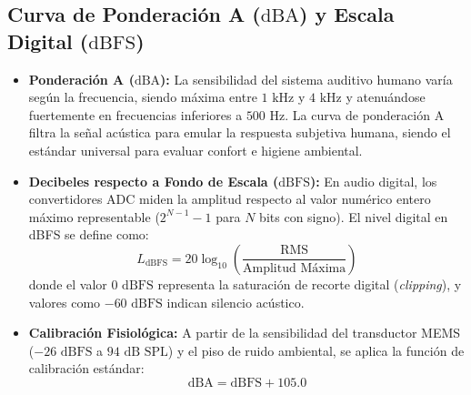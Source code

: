 \documentclass{article}
\begin{document}
\subsection{Curva de Ponderación A ($\text{dBA}$) y Escala Digital ($\text{dBFS}$)}
\begin{itemize}
    \item \textbf{Ponderación A ($\text{dBA}$):} La sensibilidad del sistema auditivo humano varía según la frecuencia, siendo máxima entre $1\text{ kHz}$ y $4\text{ kHz}$ y atenuándose fuertemente en frecuencias inferiores a $500\text{ Hz}$. La curva de ponderación A filtra la señal acústica para emular la respuesta subjetiva humana, siendo el estándar universal para evaluar confort e higiene ambiental.
    \item \textbf{Decibeles respecto a Fondo de Escala ($\text{dBFS}$):} En audio digital, los convertidores ADC miden la amplitud respecto al valor numérico entero máximo representable ($2^{N-1}-1$ para $N$ bits con signo). El nivel digital en dBFS se define como:
    \begin{equation}
        L_{\text{dBFS}} = 20 \log_{10} \left( \frac{\text{RMS}}{\text{Amplitud Máxima}} \right)
    \end{equation}
    donde el valor $0\text{ dBFS}$ representa la saturación de recorte digital (\textit{clipping}), y valores como $-60\text{ dBFS}$ indican silencio acústico.
    \item \textbf{Calibración Fisiológica:} A partir de la sensibilidad del transductor MEMS ($-26\text{ dBFS}$ a $94\text{ dB SPL}$) y el piso de ruido ambiental, se aplica la función de calibración estándar:
    \begin{equation}
        \text{dBA} = \text{dBFS} + 105.0
    \end{equation}
\end{itemize}
\end{document}
